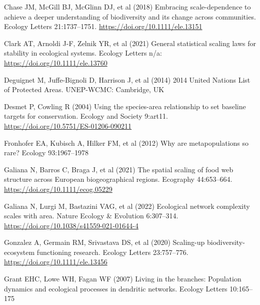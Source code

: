 \documentclass[
  12pt,
]{article}
\newlength{\cslhangindent}
\newlength{\cslentryspacingunit} %
\newenvironment{CSLReferences}[2] %
 {%
  \setlength{\parindent}{0pt}
  \ifodd #1
  \let\oldpar\par
  \def\par{\hangindent=\cslhangindent\oldpar}
  \fi
  \setlength{\parskip}{#2\cslentryspacingunit}
 }%
 {}
\begin{document}
\begin{CSLReferences}{1}{0}
\leavevmode{}%
Chase JM, McGill BJ, McGlinn DJ, et al (2018) Embracing scale-dependence to achieve a deeper understanding of biodiversity and its change across communities. Ecology Letters 21:1737--1751. \url{https://doi.org/10.1111/ele.13151}

\leavevmode{}%
Clark AT, Arnoldi J-F, Zelnik YR, et al (2021) General statistical scaling laws for stability in ecological systems. Ecology Letters n/a: \url{https://doi.org/10.1111/ele.13760}

\leavevmode{}%
Deguignet M, Juffe-Bignoli D, Harrison J, et al (2014) 2014 {United Nations List} of {Protected Areas}. UNEP-WCMC: Cambridge, UK

\leavevmode{}%
Desmet P, Cowling R (2004) Using the species-area relationship to set baseline targets for conservation. Ecology and Society 9:art11. \url{https://doi.org/10.5751/ES-01206-090211}

\leavevmode{}%
Fronhofer EA, Kubisch A, Hilker FM, et al (2012) Why are metapopulations so rare? Ecology 93:1967--1978

\leavevmode{}%
Galiana N, Barros C, Braga J, et al (2021) The spatial scaling of food web structure across {European} biogeographical regions. Ecography 44:653--664. \url{https://doi.org/10.1111/ecog.05229}

\leavevmode{}%
Galiana N, Lurgi M, Bastazini VAG, et al (2022) Ecological network complexity scales with area. Nature Ecology \& Evolution 6:307--314. \url{https://doi.org/10.1038/s41559-021-01644-4}

\leavevmode{}%
Gonzalez A, Germain RM, Srivastava DS, et al (2020) Scaling-up biodiversity-ecosystem functioning research. Ecology Letters 23:757--776. \url{https://doi.org/10.1111/ele.13456}

\leavevmode{}%
Grant EHC, Lowe WH, Fagan WF (2007) Living in the branches: Population dynamics and ecological processes in dendritic networks. Ecology Letters 10:165--175


\end{CSLReferences}
\end{document}
